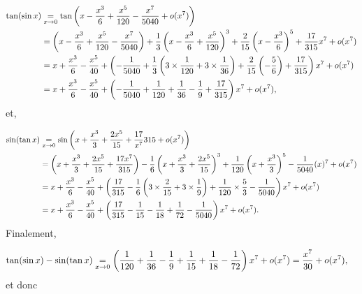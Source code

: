 {\begin{enumerate}
{\begin{align*}\ensuremath
\tan(\sin x)&\underset{x\rightarrow0}{=}\tan\left(x-\frac{x^3}{6}+\frac{x^5}{120}-\frac{x^7}{5040}+o(x^7)\right)\\
 &=\left(x-\frac{x^3}{6}+\frac{x^5}{120}-\frac{x^7}{5040}\right)+\frac{1}{3}\left(x-\frac{x^3}{6}+\frac{x^5}{120}\right)^3+\frac{2}{15}\left(x-\frac{x^3}{6}\right)^5+\frac{17}{315}x^7+o(x^7)\\
 &=x+\frac{x^3}{6}-\frac{x^5}{40}+\left(-\frac{1}{5040}+\frac{1}{3}\left(3\times\frac{1}{120}+3\times\frac{1}{36}\right)+\frac{2}{15}\left(-\frac{5}{6}\right)+\frac{17}{315}\right)x^7+o(x^7)\\
 &=x+\frac{x^3}{6}-\frac{x^5}{40}+\left(-\frac{1}{5040}+\frac{1}{120}+\frac{1}{36}-\frac{1}{9}+\frac{17}{315}\right)x^7+o(x^7),
\end{align*}
et,

\begin{align*}\ensuremath
\sin(\tan x)&\underset{x\rightarrow0}{=}\sin\left(x+\frac{x^3}{3}+\frac{2x^5}{15}+\frac{17}{x^7}{315}+o(x^7)\right)\\
 &=\left(x+\frac{x^3}{3}+\frac{2x^5}{15}+\frac{17x^7}{315}\right)-\frac{1}{6}\left(x+\frac{x^3}{3}+\frac{2x^5}{15}\right)^3+\frac{1}{120}\left(x+\frac{x^3}{3}\right)^5-\frac{1}{5040}(x)^7+o(x^7)\\
 &= x+\frac{x^3}{6}-\frac{x^5}{40}+\left(\frac{17}{315}
 -\frac{1}{6}\left(3\times\frac{2}{15}+3\times\frac{1}{9}\right)+\frac{1}{120}\times\frac{5}{3}-\frac{1}{5040}\right)x^7+o(x^7)\\
 &=x+\frac{x^3}{6}-\frac{x^5}{40}+\left(\frac{17}{315}-\frac{1}{15}-\frac{1}{18}+\frac{1}{72}-\frac{1}{5040}\right)x^7+o(x^7).
\end{align*}
Finalement,

\begin{align*}\ensuremath
\tan(\sin x)-\sin(\tan x)&\underset{x\rightarrow0}{=}\left(\frac{1}{120}+\frac{1}{36}
-\frac{1}{9}+\frac{1}{15}+\frac{1}{18}-\frac{1}{72}\right)x^7+o(x^7)
=\frac{x^7}{30}+o(x^7),
\end{align*}
et donc

\begin{center}
\end{center}}
\end{enumerate}
}